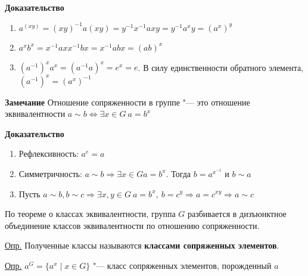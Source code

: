 \documentclass{article}
\begin{document}
\textbf{Доказательство}
\begin{enumerate}
	\item $a^{(xy)} = (xy)^{-1}a(xy) = y^{-1}x^{-1}axy = y^{-1}a^xy = (a^x)^y$
	\item $a^xb^x = x^{-1}axx^{-1}bx = x^{-1}abx = (ab)^x$
	\item $(a^{-1})^xa^x = (a^{-1}a)^x = e^x = e$. В силу единственности обратного элемента, $(a^{-1})^x = (a^x)^{-1}$
\end{enumerate}

\vspace{10pt}

\textbf{Замечание}
Отношение сопряженности в группе "--- это отношение эквивалентности $a \sim b \Leftrightarrow \exists x \in G \  a = b^x$

\textbf{Доказательство}
\begin{enumerate}
	\item Рефлексивность: $a^e = a$
	\item Симметричность: $a \sim b \Rightarrow \exists x \in G a = b^x$. Тогда $b = a^{x^{-1}}$ и $b \sim a$
	\item Пусть $a \sim b, b \sim c \Rightarrow \exists x, y \in G \  a = b^x, \  b = c^y \Rightarrow a = c^{xy} \Rightarrow a \sim c$
\end{enumerate}

\vspace{10pt}

По теореме о классах эквивалентности, группа $G$ разбивается в дизъюнктное объединение классов эквивалентности по отношению сопряженности.

\vspace{10pt}

\underline{Опр.} Полученные классы называются 
\textbf{классами сопряженных элементов}.

\underline{Опр.} $a^G = \{a^x \mid x \in G \}$ "--- класс сопряженных элементов, порожденный $a$

\vspace{10pt}
\end{document}
